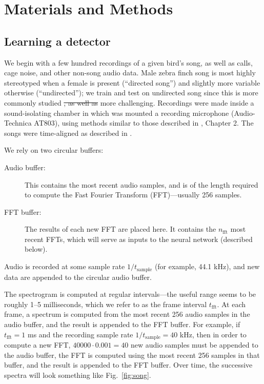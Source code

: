 \documentclass[10pt,letterpaper]{article}
\newcommand\fig[1]{Fig.~\ref{#1}}
\providecommand{\DIFaddtex}[1]{{\protect\color{blue}\uwave{#1}}} %
\providecommand{\DIFdeltex}[1]{{\protect\color{red}\sout{#1}}}                      %
\providecommand{\DIFaddbegin}{} %
\providecommand{\DIFaddend}{} %
\providecommand{\DIFdelbegin}{} %
\providecommand{\DIFdelend}{} %
\providecommand{\DIFadd}[1]{\texorpdfstring{\DIFaddtex{#1}}{#1}} %
\providecommand{\DIFdel}[1]{\texorpdfstring{\DIFdeltex{#1}}{}} %
\begin{document}
\section{Materials and Methods}
\label{sec:method}


\subsection{Learning a detector}

We begin with a few hundred recordings of a given bird's song, as well
as calls, cage noise, and other non-song audio data.  Male zebra finch
song is most highly stereotyped when a female is present (``directed
song'') and slightly more variable otherwise (``undirected''); we
train and test on undirected song since this is \DIFaddbegin \DIFadd{both }\DIFaddend more commonly
studied \DIFdelbegin \DIFdel{,
as well as }\DIFdelend \DIFaddbegin \DIFadd{and }\DIFaddend more challenging.  Recordings were made inside a
sound-isolating chamber in which was mounted a recording microphone
(Audio-Technica AT803), using methods similar to those described in
\cite{Tchernichovski2011SAP}, Chapter 2.  The songs were time-aligned
as described in \cite{Poole2012}.

We rely on two circular buffers:
 \begin{description} 
\item[Audio buffer:] This contains the most recent audio samples, and
  is of the length required to compute the Fast Fourier Transform
  (FFT)---usually 256 samples.
\item[FFT buffer:] The results of each new FFT are placed here.  It
  contains the $n_\textrm{fft}$ most recent FFTs, which will serve as
  inputs to the neural network (described below).
 \end{description} 

Audio is recorded at some sample rate $1/t_\mathrm{sample}$ (for example, 44.1 kHz), and new data are appended to the circular audio buffer.

The spectrogram is computed at regular intervals---the useful range
seems to be roughly 1--5 milliseconds, which we refer to as the frame
interval $t_\textrm{fft}$.  At each frame, a spectrum is computed from
the most recent 256 audio samples in the audio buffer, and the result
is appended to the FFT buffer.  For example, if $t_\textrm{fft}=1$ ms
and the recording sample rate $1/t_\textrm{sample}=40$ kHz, then in
order to compute a new FFT, $40000\cdot 0.001=40$ new audio samples
must be appended to the audio buffer, the FFT is computed using the
most recent 256 samples in that buffer, and the result is appended to
the FFT buffer.  Over time, the successive spectra will look something
like \fig{fig:song}.
\end{document}
